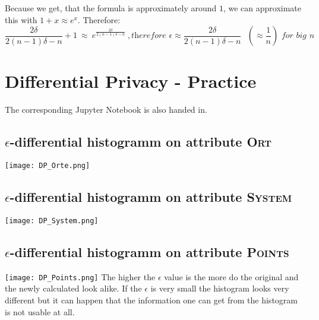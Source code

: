 \documentclass{report}
\begin{document}
		Because we get, that the formula is approximately around $1$, we can approximate this with $1 + x \approx e^x$. Therefore:
		\[
			\frac{2 \delta}{2 (n-1) \delta - n} + 1 \ \approx \ e^{\frac{2 \delta}{2 (n-1) \delta - n}} \ ,\textit{therefore $\epsilon \approx \frac{2 \delta}{2 (n-1) \delta - n}$  $(\approx \frac{1}{n})$ for big $n$}
		\]
	\closesection
	\newpage
	\section{Differential Privacy - Practice}
	\startsection
	The corresponding Jupyter Notebook is also handed in.
	\renewcommand{\thesubsection}{\thesection.\alph{subsection}}
		\subsection{$\epsilon$-differential histogramm on attribute \textsc{Ort}}
		\startsubsection
			\texttt{[image: DP\_Orte.png]}
		\closesection
		\subsection{$\epsilon$-differential histogramm on attribute \textsc{System}}
		\startsubsection
			\texttt{[image: DP\_System.png]}
		\closesection
		\subsection{$\epsilon$-differential histogramm on attribute \textsc{Points}}
		\startsubsection
			\texttt{[image: DP\_Points.png]}
		\closesection
	The higher the $\epsilon$ value is the more do the original and the newly calculated look alike. If the $\epsilon$ is very small the histogram looks very different but it can happen that the information one can get from the histogram is not usable at all.
	\closesection
\end{document}
